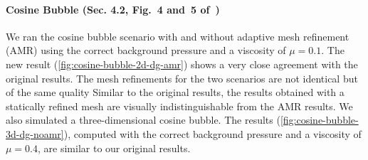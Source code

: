 \documentclass[runningheads]{llncs}
\begin{document}
\paragraph{Cosine Bubble (Sec. 4.2, Fig.~4 and~5 of~\cite{krenz2019high})}
We ran the cosine bubble scenario with and without adaptive mesh refinement (AMR) using the correct background pressure and a viscosity of $\mu=0.1$. 
The new result (\cref{fig:cosine-bubble-2d-dg-amr}) shows a very close agreement with the original results.
The mesh refinements for the two scenarios are not identical but of the same quality
Similar to the original results, the results obtained with a statically refined mesh are visually indistinguishable from the AMR results.
We also simulated a three-dimensional cosine bubble.
The results (\cref{fig:cosine-bubble-3d-dg-noamr}), computed with the correct background pressure and a viscosity of $\mu=0.4$, are similar to our original results.
\end{document}
